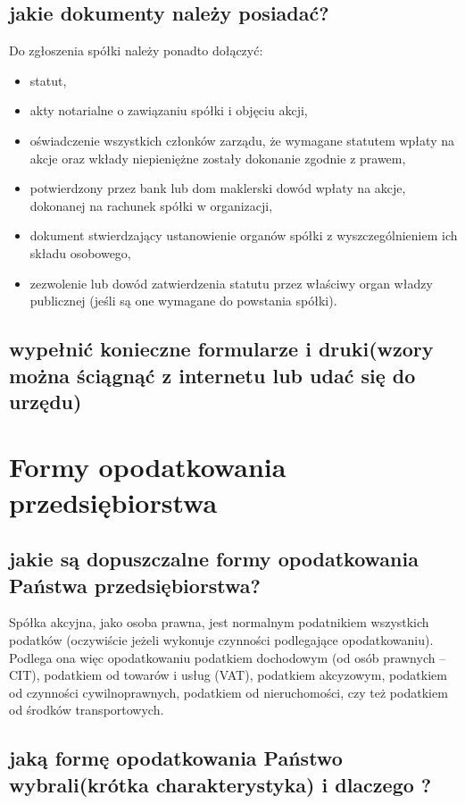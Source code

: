 \documentclass[a4paper, 11pt]{article}
\begin{document}
\subsection{jakie dokumenty należy posiadać?}
Do zgłoszenia spółki należy ponadto dołączyć:
\begin{itemize}
\item statut,
\item akty notarialne o zawiązaniu spółki i objęciu akcji,
\item oświadczenie wszystkich członków zarządu, że wymagane statutem wpłaty na akcje oraz wkłady niepieniężne zostały dokonanie zgodnie z prawem,
\item potwierdzony przez bank lub dom maklerski dowód wpłaty na akcje, dokonanej na rachunek spółki w organizacji,
\item dokument stwierdzający ustanowienie organów spółki z wyszczególnieniem ich składu osobowego,
\item zezwolenie lub dowód zatwierdzenia statutu przez właściwy organ władzy publicznej (jeśli są one wymagane do powstania spółki).
\end{itemize}


\subsection{wypełnić konieczne formularze i druki(wzory można ściągnąć z internetu lub udać się do urzędu)}

\section{Formy opodatkowania przedsiębiorstwa}

\subsection{jakie są dopuszczalne formy opodatkowania Państwa przedsiębiorstwa?}
Spółka akcyjna, jako osoba prawna, jest normalnym podatnikiem wszystkich podatków (oczywiście jeżeli wykonuje czynności podlegające opodatkowaniu).
Podlega ona więc opodatkowaniu podatkiem dochodowym (od osób prawnych – CIT), podatkiem od towarów i usług (VAT), podatkiem akcyzowym, podatkiem od czynności cywilnoprawnych, podatkiem od nieruchomości, czy też podatkiem od środków transportowych.


\subsection{jaką formę opodatkowania Państwo wybrali(krótka charakterystyka) i dlaczego ?}
\end{document}

